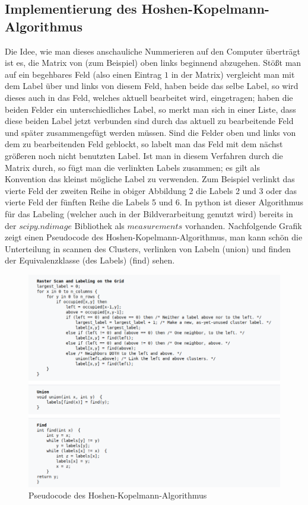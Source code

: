 \documentclass[a4paper, 12pt]{report}
\begin{document}
\subsection{Implementierung des Hoshen-Kopelmann-Algorithmus}
Die Idee, wie man dieses anschauliche Nummerieren auf den Computer überträgt ist es, die Matrix von (zum Beispiel) oben links beginnend abzugehen. Stößt man auf ein begehbares Feld (also einen Eintrag $1$ in der Matrix) vergleicht man mit dem Label über und links von diesem Feld, haben beide das selbe Label, so wird dieses auch in das Feld, welches aktuell bearbeitet wird, eingetragen; haben die beiden Felder ein unterschiedliches Label, so merkt man sich in einer Liste, dass diese beiden Label jetzt verbunden sind durch das aktuell zu bearbeitende Feld und später zusammengefügt werden müssen. Sind die Felder oben und links von dem zu bearbeitenden Feld geblockt, so labelt man das Feld mit dem nächst größeren noch nicht benutzten Label. Ist man in diesem Verfahren durch die Matrix durch, so fügt man die verlinkten Labels zusammen; es gilt als Konvention das kleinst mögliche Label zu verwenden. Zum Beispiel verlinkt das vierte Feld der zweiten Reihe in obiger Abbildung 2 die Labels 2 und 3 oder das vierte Feld der fünften Reihe die Labels 5 und 6.
\noindent In python ist dieser Algorithmus für das Labeling (welcher auch in der Bildverarbeitung genutzt wird) bereits in der $scipy.ndimage$ Bibliothek als $measurements$ vorhanden. Nachfolgende Grafik zeigt einen Pseudocode\cite{Fricke} des Hoshen-Kopelmann-Algorithmus, man kann schön die Unterteilung in scannen des Clusters, verlinken von Labeln (union) und finden der Equivalenzklasse (des Labels) (find) sehen.\newpage

\begin{figure}
	\centering
	\includegraphics[scale=0.7]{HSK_pseudocode.png}
	\caption{Pseudocode des Hoshen-Kopelmann-Algorithmus}
\end{figure}
\end{document}
